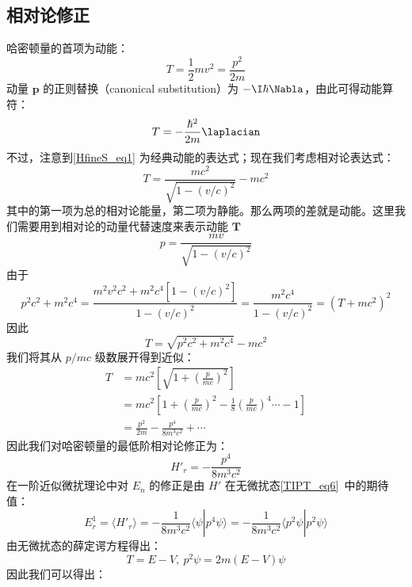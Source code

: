 \subsection{相对论修正}
哈密顿量的首项为动能：
\begin{equation}\label{HfineS_eq1}
T=\frac{1}{2}mv^2=\frac{p^2}{2m}
\end{equation}
动量 $\mathbf p$ 的正则替换（canonical substitution）为 $-\I\hbar\Nabla$，由此可得动能算符：
\begin{equation}
T=-\frac{\hbar^2}{2m}\laplacian
\end{equation}
不过，注意到\autoref{HfineS_eq1} 为经典动能的表达式；现在我们考虑相对论表达式：
\begin{equation}
T=\frac{mc^2}{\sqrt{1-(v/c)^2}}-mc^2
\end{equation}
其中的第一项为总的相对论能量，第二项为静能。那么两项的差就是动能。这里我们需要用到相对论的动量代替速度来表示动能 $\mathbf T$
\begin{equation}
p=\frac{mv}{\sqrt{1-(v/c)^2}}
\end{equation}
由于
\begin{equation}
p^2c^2+m^2c^4=\frac{m^2v^2c^2+m^2c^4[1-(v/c)^2]}{1-(v/c)^2}=\frac{m^2c^4}{1-(v/c)^2}=(T+mc^2)^2
\end{equation}
因此
\begin{equation}
T=\sqrt{p^2c^2+m^2c^4}-mc^2
\end{equation}
我们将其从 $p/mc$ 级数展开得到近似：
\begin{align}
T &= mc^2\left[\sqrt{1+\left(\frac{p}{mc}\right)^2}\right]\\ 
&=mc^2\left[1+\left(\frac{p}{mc}\right)^2-\frac{1}{8}\left(\frac{p}{mc}\right)^4\cdots -1\right]\\
&=\frac{p^2}{2m}-\frac{p^4}{8m^3c^2}+\cdots
\end{align}
因此我们对哈密顿量的最低阶相对论修正为：
\begin{equation}
H'_r=-\frac{p^4}{8m^3c^2}
\end{equation}
在一阶近似微扰理论中对 $E_n$ 的修正是由 $H'$ 在无微扰态\autoref{TIPT_eq6}~中的期待值：
\begin{equation}\label{HfineS_eq16}
E_r^1=\langle H'_r\rangle=-\frac{1}{8m^3c^2}\langle\psi|p^4\psi\rangle=-\frac{1}{8m^3c^2}\langle p^2\psi|p^2\psi\rangle
\end{equation}
由无微扰态的薛定谔方程得出：
\begin{equation}
T=E-V, \ p^2\psi = 2m(E-V)\psi
\end{equation}
因此我们可以得出：
